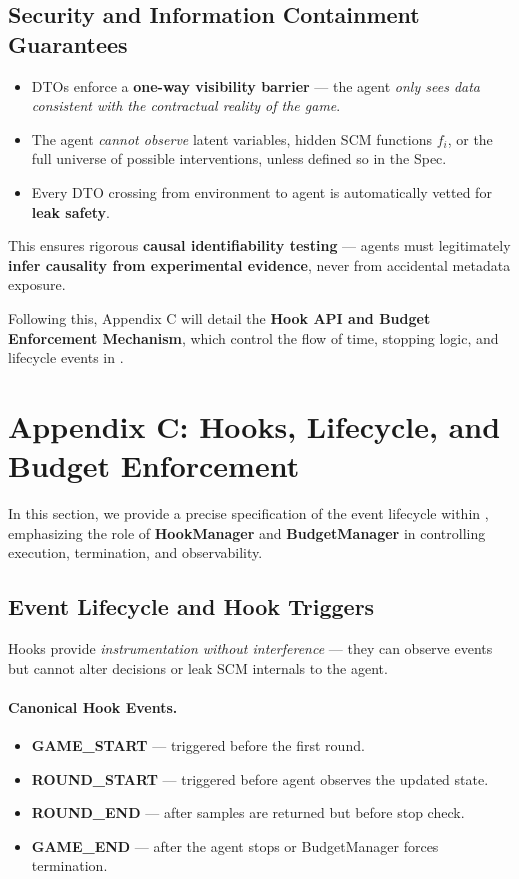 \subsection{Security and Information Containment Guarantees}

\begin{itemize}
    \item DTOs enforce a \textbf{one-way visibility barrier} — the agent \emph{only sees data consistent with the contractual reality of the game}.
    \item The agent \emph{cannot observe} latent variables, hidden SCM functions $f_i$, or the full universe of possible interventions, unless defined so in the Spec.
    \item Every DTO crossing from environment to agent is automatically vetted for \textbf{leak safety}.
\end{itemize}

This ensures rigorous \textbf{causal identifiability testing} — agents must legitimately \textbf{infer causality from experimental evidence}, never from accidental metadata exposure.

\bigskip
Following this, Appendix C will detail the \textbf{Hook API and Budget Enforcement Mechanism}, which control the flow of time, stopping logic, and lifecycle events in \game.


\section{Appendix C: Hooks, Lifecycle, and Budget Enforcement}
\label{appendix:hooks_budget}

In this section, we provide a precise specification of the event lifecycle within \game, emphasizing the role of \textbf{HookManager} and \textbf{BudgetManager} in controlling execution, termination, and observability.

\subsection{Event Lifecycle and Hook Triggers}
Hooks provide \emph{instrumentation without interference} — they can observe events but cannot alter decisions or leak SCM internals to the agent.

\paragraph{Canonical Hook Events.}
\begin{itemize}
    \item \textbf{GAME\_START} — triggered before the first round.
    \item \textbf{ROUND\_START} — triggered before agent observes the updated state.
    \item \textbf{ROUND\_END} — after samples are returned but before stop check.
    \item \textbf{GAME\_END} — after the agent stops or BudgetManager forces termination.
\end{itemize}

